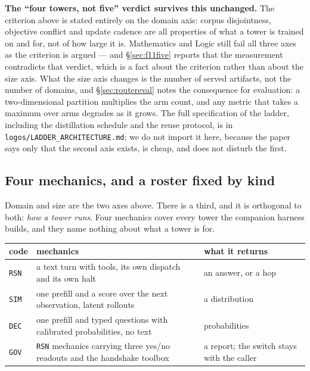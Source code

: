 \documentclass[11pt]{article}
\begin{document}
\textbf{The ``four towers, not five'' verdict survives this unchanged.} The criterion above is stated entirely on the domain axis: corpus disjointness, objective conflict and update cadence are all properties of what a tower is trained on and for, not of how large it is. Mathematics and Logic still fail all three axes as the criterion is argued --- and \S\ref{sec:f11five} reports that the measurement contradicts that verdict, which is a fact about the criterion rather than about the size axis. What the size axis changes is the number of served artifacts, not the number of domains, and \S\ref{sec:routereval} notes the consequence for evaluation: a two-dimensional partition multiplies the arm count, and any metric that takes a maximum over arms degrades as it grows. The full specification of the ladder, including the distillation schedule and the reuse protocol, is in \texttt{logos/LADDER\_ARCHITECTURE.md}; we do not import it here, because the paper says only that the second axis exists, is cheap, and does not disturb the first.

\subsection{Four mechanics, and a roster fixed by kind}
\label{sec:mechanics}

Domain and size are the two axes above. There is a third, and it is orthogonal to both: \emph{how a tower runs}. Four mechanics cover every tower the companion harness builds, and they name nothing about what a tower is for.

\begin{center}
\begin{tabular}{@{}lll@{}}
\toprule
code & mechanics & what it returns \\
\midrule
\texttt{RSN} & a text turn with tools, its own dispatch and its own halt & an answer, or a hop \\
\texttt{SIM} & one prefill and a score over the next observation, latent rollouts & a distribution \\
\texttt{DEC} & one prefill and typed questions with calibrated probabilities, no text & probabilities \\
\texttt{GOV} & \texttt{RSN} mechanics carrying three yes/no readouts and the handshake toolbox & a report; the switch stays with the caller \\
\bottomrule
\end{tabular}
\end{center}
\end{document}

